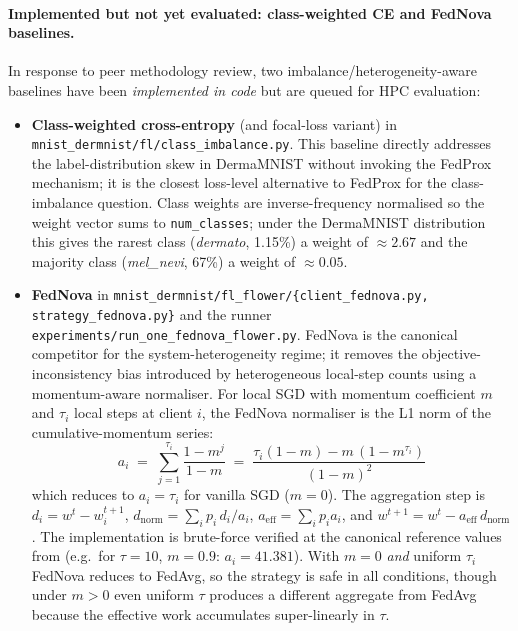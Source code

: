\documentclass[11pt,a4paper]{article}
\begin{document}
\paragraph{Implemented but not yet evaluated: class-weighted CE and
FedNova baselines.} In response to peer methodology review, two
imbalance/heterogeneity-aware baselines have been
\emph{implemented in code} but are queued for HPC evaluation:
\begin{itemize}
\item \textbf{Class-weighted cross-entropy} (and focal-loss
\citep{lin2017focal} variant) in
\texttt{mnist\_dermnist/fl/class\_imbalance.py}. This baseline directly
addresses the label-distribution skew in DermaMNIST without invoking the
FedProx mechanism; it is the closest loss-level alternative to FedProx
for the class-imbalance question. Class weights are inverse-frequency
normalised so the weight vector sums to \texttt{num\_classes}; under the
DermaMNIST distribution this gives the rarest class (\textit{dermato},
1.15\%) a weight of $\approx 2.67$ and the majority class
(\textit{mel\_nevi}, 67\%) a weight of $\approx 0.05$.
\item \textbf{FedNova} \citep{wang2020fednova} in
\texttt{mnist\_dermnist/fl\_flower/\{client\_fednova.py, strategy\_fednova.py\}}
and the runner \texttt{experiments/run\_one\_fednova\_flower.py}.
FedNova is the canonical competitor for the system-heterogeneity
regime; it removes the objective-inconsistency bias introduced by
heterogeneous local-step counts using a momentum-aware normaliser.
For local SGD with momentum coefficient $m$ and $\tau_i$ local steps
at client $i$, the FedNova normaliser is the L1 norm of the
cumulative-momentum series:
\[
a_i \;=\; \sum_{j=1}^{\tau_i} \frac{1 - m^j}{1 - m}
       \;=\; \frac{\tau_i (1 - m) - m\,(1 - m^{\tau_i})}{(1-m)^2}
\]
which reduces to $a_i = \tau_i$ for vanilla SGD ($m = 0$). The
aggregation step is $d_i = w^t - w_i^{t+1}$,
$d_\text{norm} = \sum_i p_i\,d_i / a_i$,
$a_\text{eff} = \sum_i p_i a_i$, and
$w^{t+1} = w^t - a_\text{eff}\,d_\text{norm}$. The implementation is
brute-force verified at the canonical reference values from
\citet{wang2020fednova} (e.g.\ for $\tau = 10$, $m = 0.9$:
$a_i = 41.381$). With $m = 0$ \emph{and} uniform $\tau_i$ FedNova
reduces to FedAvg, so the strategy is safe in all conditions, though
under $m > 0$ even uniform $\tau$ produces a different aggregate from
FedAvg because the effective work accumulates super-linearly in
$\tau$.


\end{itemize}
\end{document}
